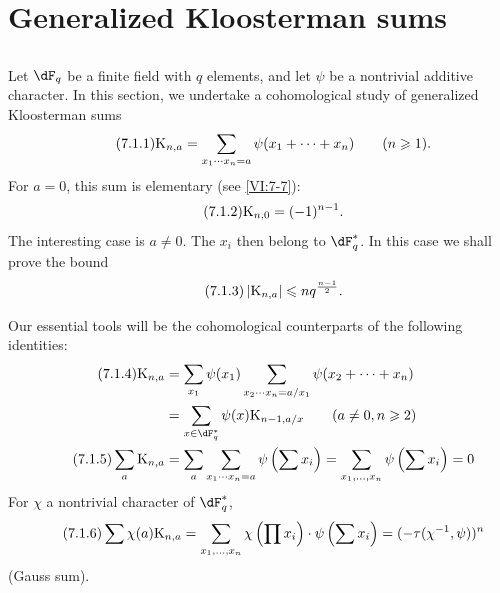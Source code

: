\documentclass[oneside]{book}
\newcounter{char}
\newcommand{\kloos}{\textnormal{K}} %
\theoremstyle{sga-source}
\theoremstyle{sga-source-dash}
\theoremstyle{sga-source-dotdash}
\theoremstyle{sga-source-number-note-dash}
\theoremstyle{sga-source-note-number-dotdash}
\theoremstyle{sga-source-example-dotdash}
\theoremstyle{sga-source-inline-number}
\theoremstyle{sga-source-bare-number}
\theoremstyle{sga-source}
\newcommand{\PrintPage}[1]{}\newcommand{\MathPage}[1]{}\newcommand{\PrintCite}[2]{#1}\newcommand{\var}[3]{#2}
\begin{document}
\PrintPage{219}
\section{Generalized Kloosterman sums}\label{VI:7}





\subsection{}\label{VI:7-1}

Let $\dF_q$ be a finite field with $q$ elements, and let $\psi$ be a nontrivial 
additive character. In this section, we undertake a cohomological study of 
generalized Kloosterman sums 
\begin{equation*}\tag{7.1.1}\label{VI:eq:7-1-1}
  \kloos_{n,a} = \sum_{x_1\dotsm x_n = a} \psi(x_1+\cdots + x_n) \qquad (n\geqslant 1) \text{.} 
\end{equation*}
For $a=0$, this sum is elementary (see \ref{VI:7-7}): 
\begin{equation*}\tag{7.1.2}\label{VI:eq:7-1-2}
  \kloos_{n,0} = (-1)^{n-1} \text{.} 
\end{equation*}
The interesting case is $a\ne 0$. The $x_i$ then belong to 
$\dF_q^\ast$. In this case we shall prove the bound 
\begin{equation*}\tag{7.1.3}\label{VI:eq:7-1-3}
  \left|\kloos_{n,a}\right| \leqslant n q^{\frac{n-1}{2}} \text{.} 
\end{equation*}

Our essential tools will be the cohomological counterparts of the 
following identities: 
\begin{align*}\tag{7.1.4}\label{VI:eq:7-1-4}
  \kloos_{n,a} &= \sum_{x_1} \psi(x_1) \sum_{x_2\dotsm x_n = a/x_1} \psi(x_2+\cdots + x_n) \\ \notag
    &= \sum_{x\in \dF_q^\ast} \psi(x) \kloos_{n-1,a/x} \qquad (a\ne 0,n\geqslant 2) \\ \tag{7.1.5}\label{VI:eq:7-1-5}
  \sum_a \kloos_{n,a} &= \sum_a \sum_{x_1 \dotsm x_n = a} \psi\left(\sum x_i\right) = \sum_{x_1,\dots,x_n} \psi\left(\sum x_i\right) = 0 
\end{align*}
For $\chi$ a nontrivial character of $\dF_q^\ast$, 
\begin{equation*}\tag{7.1.6}\label{VI:eq:7-1-6}
  \sum \chi(a) \kloos_{n,a} = \sum_{x_1,\dots,x_n} \chi\left(\prod x_i\right) \cdot \psi\left(\sum x_i\right) = (-\tau(\chi^{-1},\psi))^n 
\end{equation*}
(Gauss sum). 
\end{document}
